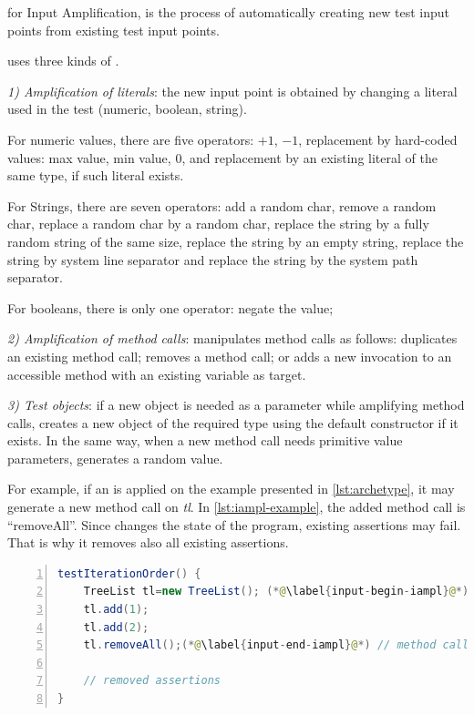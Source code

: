 \textbf{\Iampl} for Input Amplification, is the process of automatically creating new test input points from existing test input points.

\dspot uses three kinds of \Iampl.

\emph{1) Amplification of literals}: the new input point is obtained by changing a literal used in the test (numeric, boolean, string).

For numeric values, there are five operators: 
$+1$,
$-1$,
replacement by hard-coded values: max value,
min value,
0, 
and replacement by an existing literal of the same type, if such literal exists.

For Strings, there are seven operators: 
add a random char, 
remove a random char, 
replace a random char by a random char, 
replace the string by a fully random string of the same size, 
replace the string by an empty string, 
replace the string by system line separator 
and replace the string by the system path separator.

For booleans, there is only one operator: negate the value;

\emph{2) Amplification of method calls}: \dspot manipulates method calls as follows:
\dspot duplicates an existing method call; removes a method call;
or adds a new invocation to an accessible method with an existing variable as target.

\emph{3) Test objects}:
if a new object is needed as a parameter while amplifying method calls, \dspot creates a new object of the required type using the default constructor if it exists.
In the same way, when a new method call needs primitive value parameters, \dspot generates a random value.

For example, if an \Iampl is applied on the example presented in \autoref{lst:archetype}, it may generate a new method call on \emph{tl}.
In \autoref{lst:iampl-example}, the added method call is ``removeAll''.
Since \dspot changes the state of the program, existing assertions may fail. 
That is why it removes also all existing assertions.

\begin{lstlisting}[caption={An example of an \Iampl{}: the amplification added a method call to \emph{removeAll()} on \emph{tl}.},label=lst:iampl-example,float,language=java,numbers=left] 
testIterationOrder() {
	TreeList tl=new TreeList(); (*@\label{input-begin-iampl}@*)
	tl.add(1);
	tl.add(2);
	tl.removeAll();(*@\label{input-end-iampl}@*) // method call added
	
	// removed assertions
}
\end{lstlisting}

